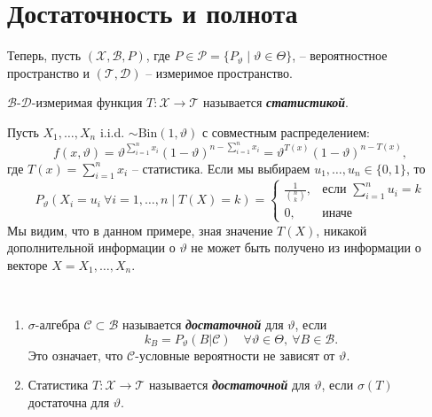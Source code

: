 \chapter{Достаточность и полнота}

Теперь, пусть $(\mathcal{X}, \mathcal{B}, P)$, где $P \in \mathcal{P} = \{P_\vartheta \mid \vartheta \in \Theta \} $, -- вероятностное пространство и $(\mathcal{T}, \mathcal{D})$ -- измеримое пространство.

\begin{defn}
	$\mathcal{B}$-$\mathcal{D}$-измеримая функция $T:\mathcal{X} \rightarrow \mathcal{T}$ называется \textbf{\textit{статистикой}}.
\end{defn}

\begin{exmp} \label{exmp4.2}
	Пусть $X_1, \dots, X_n$ i.i.d. $\sim \mathrm{Bin}(1, \vartheta)$ с совместным распределением:
	\[ f(x, \vartheta) = \vartheta^{\sum_{i=1}^{n}x_i}(1-\vartheta)^{n-\sum_{i=1}^{n}x_i}=\vartheta^{T(x)}(1-\vartheta)^{n-T(x)}, \]
	где $T(x)=\sum_{i=1}^{n}x_i$ -- статистика.
	Если мы выбираем $u_1, \dots, u_n \in \{0,1\}$, то
	\[
		P_\vartheta(X_i=u_i \  \forall i = 1, \dots, n \mid T(X)=k)=\left \{
		\begin{array}{cl}
		\frac{1}{\binom{n}{k}}, & \text{если } \sum_{i=1}^{n}u_i=k \\
		0, & \text{иначе}
		\end{array}
		\right.
	\]
	Мы видим, что в данном примере, зная значение $T(X)$, никакой дополнительной информации о $\vartheta$ не может быть получено из информации о векторе $X=X_1, \dots, X_n$.
\end{exmp}

\begin{defn} \
	\begin{enumerate}
		\item $\sigma$-алгебра $\mathcal{C} \subset \mathcal{B}$ называется \textbf{\textit{достаточной}} для $\vartheta$, если
		\[ k_B=P_\vartheta(B | \mathcal{C}) \quad \forall \vartheta \in \Theta,\ \forall B \in \mathcal{B}. \]
		Это означает, что $\mathcal{C}$-условные вероятности не зависят от $\vartheta$.
		\item Статистика $T\colon\mathcal{X} \rightarrow \mathcal{T}$ называется \textbf{\textit{достаточной}} для $\vartheta$, если $\sigma(T)$ достаточна для $\vartheta$.
	\end{enumerate}
\end{defn}


